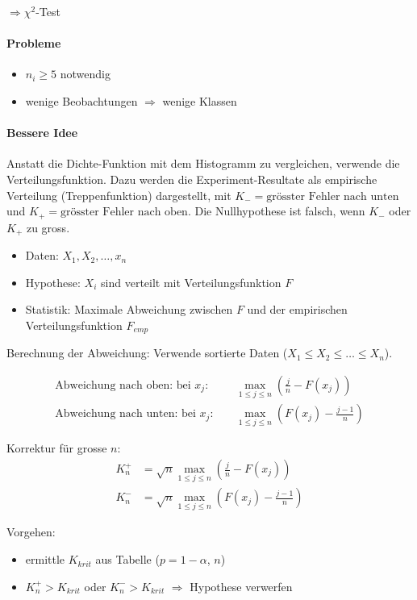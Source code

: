 \documentclass[10pt,a4paper]{scrartcl}
\begin{document}
$\Rightarrow \chi^2$-Test 

\paragraph{Probleme}
\begin{itemize}
\item $n_i \ge 5$ notwendig
\item wenige Beobachtungen $\Rightarrow$ wenige Klassen
\end{itemize}

\paragraph{Bessere Idee}
Anstatt die Dichte-Funktion mit dem Histogramm zu vergleichen, verwende die Verteilungsfunktion. Dazu werden die Experiment-Resultate als empirische Verteilung (Treppenfunktion) dargestellt, mit $K_- = \text{grösster Fehler nach unten}$ und $K_+=\text{grösster Fehler nach oben}$. Die Nullhypothese ist falsch, wenn $K_-$ oder $K_+$ zu gross.
\fi

\begin{itemize}
\item Daten: $X_1, X_2, \dots, x_n$
\item Hypothese: $X_i$ sind verteilt mit Verteilungsfunktion $F$
\item Statistik: Maximale Abweichung zwischen $F$ und der empirischen Verteilungsfunktion $F_{emp}$
\end{itemize}

Berechnung der Abweichung: Verwende sortierte Daten ($X_1 \le X_2 \le \dots \le X_n$).

\begin{align*}
\text{Abweichung nach oben: bei } x_j: \quad & \max_{1\le j \le n}\left( \frac{j}{n} - F(x_j) \right) \\
\text{Abweichung nach unten: bei } x_j: \quad & \max_{1\le j \le n}\left( F(x_j) - \frac{j-1}{n}\right) 
\end{align*}

Korrektur für grosse $n$: 
\begin{align*}
K_n^+ &= \sqrt{n} \max_{1\le j \le n}\left(\frac{j}{n} - F(x_j)\right) \\
K_n^- &= \sqrt{n} \max_{1\le j \le n}\left(F(x_j) - \frac{j-1}{n}\right)
\end{align*}

Vorgehen:
\begin{itemize}
\item ermittle $K_{krit}$ aus Tabelle ($p=1-\alpha$, $n$)
\item $K_n^+ > K_{krit}$ oder $K_n^- > K_{krit}$ $\Rightarrow$ Hypothese verwerfen
\end{itemize}
\end{document}
